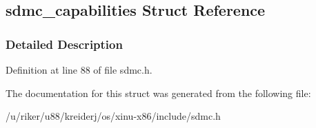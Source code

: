 \hypertarget{structsdmc__capabilities}{}\subsection{sdmc\+\_\+capabilities Struct Reference}
\label{structsdmc__capabilities}


\subsubsection{Detailed Description}


Definition at line 88 of file sdmc.\+h.



The documentation for this struct was generated from the following file\+:\begin{DoxyCompactItemize}
\item 
/u/riker/u88/kreiderj/os/xinu-\/x86/include/sdmc.\+h\end{DoxyCompactItemize}
